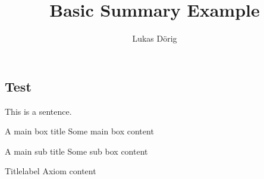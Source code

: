 \def\lutilpath{../..}



\title{Basic Summary Example}
\author{Lukas Dörig}



\maketitle

\begin{multicols*}{2}
  \section{Test}

  This is a sentence.

  \begin{mainbox}{A main box title}
    Some main box content
  \end{mainbox}

  \begin{subbox}{A main sub title}
    Some sub box content
  \end{subbox}

  \begin{axiom}{Title}{label}
    Axiom content
  \end{axiom}
\end{multicols*}


